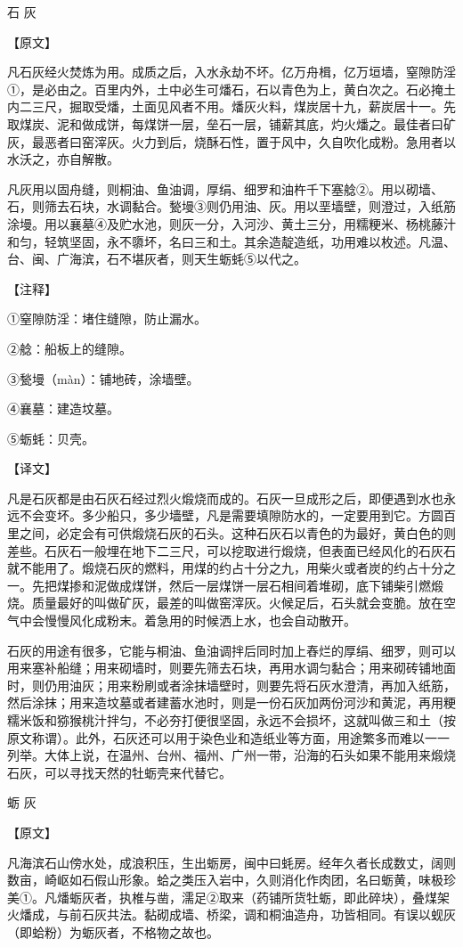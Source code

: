 \documentclass[12pt,UTF8]{ctexbook}
\begin{document}
石 灰

【原文】

凡石灰经火焚炼为用。成质之后，入水永劫不坏。亿万舟楫，亿万垣墙，窒隙防淫①，是必由之。百里内外，土中必生可燔石，石以青色为上，黄白次之。石必掩土内二三尺，掘取受燔，土面见风者不用。燔灰火料，煤炭居十九，薪炭居十一。先取煤炭、泥和做成饼，每煤饼一层，垒石一层，铺薪其底，灼火燔之。最佳者曰矿灰，最恶者曰窑滓灰。火力到后，烧酥石性，置于风中，久自吹化成粉。急用者以水沃之，亦自解散。

凡灰用以固舟缝，则桐油、鱼油调，厚绢、细罗和油杵千下塞艌②。用以砌墙、石，则筛去石块，水调黏合。甃墁③则仍用油、灰。用以垩墙壁，则澄过，入纸筋涂墁。用以襄墓④及贮水池，则灰一分，入河沙、黄土三分，用糯粳米、杨桃藤汁和匀，轻筑坚固，永不隳坏，名曰三和土。其余造靛造纸，功用难以枚述。凡温、台、闽、广海滨，石不堪灰者，则天生蛎蚝⑤以代之。

【注释】

①窒隙防淫：堵住缝隙，防止漏水。

②艌：船板上的缝隙。

③甃墁（màn）：铺地砖，涂墙壁。

④襄墓：建造坟墓。

⑤蛎蚝：贝壳。

【译文】

凡是石灰都是由石灰石经过烈火煅烧而成的。石灰一旦成形之后，即便遇到水也永远不会变坏。多少船只，多少墙壁，凡是需要填隙防水的，一定要用到它。方圆百里之间，必定会有可供煅烧石灰的石头。这种石灰石以青色的为最好，黄白色的则差些。石灰石一般埋在地下二三尺，可以挖取进行煅烧，但表面已经风化的石灰石就不能用了。煅烧石灰的燃料，用煤的约占十分之九，用柴火或者炭的约占十分之一。先把煤掺和泥做成煤饼，然后一层煤饼一层石相间着堆砌，底下铺柴引燃煅烧。质量最好的叫做矿灰，最差的叫做窑滓灰。火候足后，石头就会变脆。放在空气中会慢慢风化成粉末。着急用的时候洒上水，也会自动散开。

石灰的用途有很多，它能与桐油、鱼油调拌后同时加上舂烂的厚绢、细罗，则可以用来塞补船缝；用来砌墙时，则要先筛去石块，再用水调匀黏合；用来砌砖铺地面时，则仍用油灰；用来粉刷或者涂抹墙壁时，则要先将石灰水澄清，再加入纸筋，然后涂抹；用来造坟墓或者建蓄水池时，则是一份石灰加两份河沙和黄泥，再用粳糯米饭和猕猴桃汁拌匀，不必夯打便很坚固，永远不会损坏，这就叫做三和土（按原文称谓）。此外，石灰还可以用于染色业和造纸业等方面，用途繁多而难以一一列举。大体上说，在温州、台州、福州、广州一带，沿海的石头如果不能用来煅烧石灰，可以寻找天然的牡蛎壳来代替它。

蛎 灰

【原文】

凡海滨石山傍水处，成浪积压，生出蛎房，闽中曰蚝房。经年久者长成数丈，阔则数亩，崎岖如石假山形象。蛤之类压入岩中，久则消化作肉团，名曰蛎黄，味极珍美①。凡燔蛎灰者，执椎与凿，濡足②取来（药铺所货牡蛎，即此碎块），叠煤架火燔成，与前石灰共法。黏砌成墙、桥梁，调和桐油造舟，功皆相同。有误以蚬灰（即蛤粉）为蛎灰者，不格物之故也。
\end{document}
